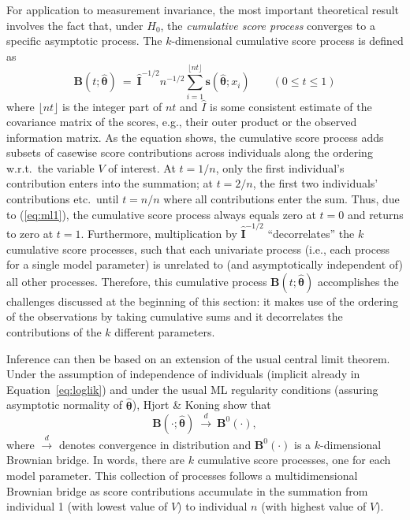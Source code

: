 \documentclass[man]{apa}
\begin{document}
For application to measurement invariance, the most important
theoretical result involves the fact that, under $H_0$, the
\emph{cumulative score process} converges to a specific asymptotic
process. The $k$-dimensional cumulative score process is defined as
\begin{equation} \label{eq:cumscore}
  {\bm B}(t; \hat {\bm \theta}) ~=~ \hat {\bm I}^{-1/2} n^{-1/2}
    \sum_{i = 1}^{\lfloor n t \rfloor} {\bm s}(\hat {\bm \theta}; x_i)
  \qquad (0 \le t \le 1)
\end{equation}
where $\lfloor nt \rfloor$ is the integer part of $nt$ and
$\hat I$ is some consistent estimate of the covariance matrix of the scores,
e.g., their outer product or the observed information matrix.
As the equation shows, the cumulative score process adds subsets of
casewise score contributions across individuals along the ordering
w.r.t.\ the variable $V$ of interest. At $t=1/n$, only the
first individual's contribution enters into the summation; at
$t=2/n$, the first two individuals' contributions etc.\ until $t = n/n$
where all contributions enter the sum. Thus, due to (\ref{eq:ml1}),
the cumulative score process always equals zero at $t = 0$ and
returns to zero at $t = 1$. Furthermore, multiplication by
$\hat {\bm I}^{-1/2}$ ``decorrelates'' the $k$ cumulative score
processes, such that each univariate process (i.e., each
process for a single model parameter) is unrelated to (and asymptotically independent of) all other
processes. Therefore, this cumulative process ${\bm B}(t; \hat {\bm \theta})$
accomplishes the challenges discussed at the beginning of this section:
it makes use of the ordering of the observations by taking cumulative sums
and it decorrelates the contributions of the $k$ different parameters.

Inference can then be based on an extension of the usual central limit
theorem. Under the assumption of independence of individuals (implicit
already in Equation~\ref{eq:loglik}) and under
the usual ML regularity conditions (assuring asymptotic normality
of $\hat {\bm \theta}$), Hjort \& Koning \citeyear{HjoKon02} show
that 
\begin{equation} \label{eq:fclt}
  {\bm B}(\cdot; \hat {\bm \theta}) ~\overset{d}{\rightarrow}~ {\bm B}^{0}(\cdot),
\end{equation}
where $\overset{d}{\rightarrow}$ denotes convergence in distribution
and ${\bm B}^{0}(\cdot)$ is a $k$-dimensional Brownian bridge.
In words, there are $k$ cumulative score processes, one for each
model parameter.  This collection of processes follows a
multidimensional Brownian bridge as score contributions accumulate in the 
summation from individual 1 (with lowest value of $V$) to individual $n$
(with highest value of $V$).
\end{document}
